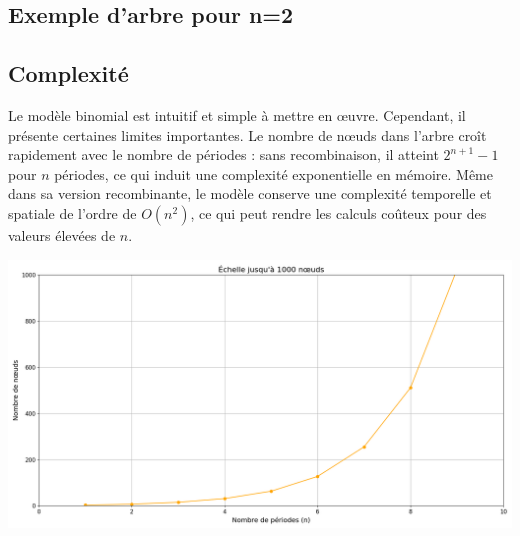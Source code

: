 \documentclass[12pt,a4paper]{article}
\begin{document}
\subsection{Exemple d'arbre pour n=2}
\begin{center}
\end{center}

\subsection{Complexité}
Le modèle binomial est intuitif et simple à mettre en œuvre. Cependant, il présente certaines limites importantes. Le nombre de nœuds dans l’arbre croît rapidement avec le nombre de périodes : sans recombinaison, il atteint \(2^{n+1} - 1\) pour \(n\) périodes, ce qui induit une complexité exponentielle en mémoire. Même dans sa version recombinante, le modèle conserve une complexité temporelle et spatiale de l’ordre de \(O(n^2)\), ce qui peut rendre les calculs coûteux pour des valeurs élevées de \(n\).

\begin{center}
    \includegraphics[width=1\textwidth]{lim.png}
\end{center}
\end{document}
